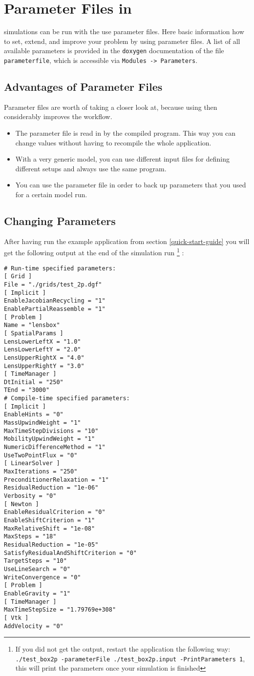 \section{Parameter Files in \Dumux}
\label{sec:inputFiles}
\Dumux simulations can be run with the use parameter files. Here basic information how to set,
extend, and improve your problem by using parameter files.
A list of all available parameters is provided in the \texttt{doxygen} documentation
of the file \texttt{parameterfile}, which is accessible via \texttt{Modules -> Parameters}.

\subsection{Advantages of Parameter Files}
Parameter files are worth of taking a closer look at, because using then considerably
improves the workflow.

\begin{itemize}
  \item The parameter file is read in by the compiled program. This way you can change
        values without having to recompile the whole application.
  \item With a very generic model, you can use different input files for defining different
        setups and always use the same program.
  \item You can use the parameter file in order to back up parameters that you used for
        a certain model run.
\end{itemize}

\subsection{Changing Parameters}
After having run the example application from section \ref{quick-start-guide} you will
get the following output at the end of the simulation run
\footnote{If you did not get the output, restart the application the following way:
\texttt{./test{\_}box2p -parameterFile ./test\_box2p.input -PrintParameters 1},
this will print the parameters once your simulation is finished}
:
\begin{lstlisting}[style=Bash]
# Run-time specified parameters:
[ Grid ]
File = "./grids/test_2p.dgf"
[ Implicit ]
EnableJacobianRecycling = "1"
EnablePartialReassemble = "1"
[ Problem ]
Name = "lensbox"
[ SpatialParams ]
LensLowerLeftX = "1.0"
LensLowerLeftY = "2.0"
LensUpperRightX = "4.0"
LensUpperRightY = "3.0"
[ TimeManager ]
DtInitial = "250"
TEnd = "3000"
# Compile-time specified parameters:
[ Implicit ]
EnableHints = "0"
MassUpwindWeight = "1"
MaxTimeStepDivisions = "10"
MobilityUpwindWeight = "1"
NumericDifferenceMethod = "1"
UseTwoPointFlux = "0"
[ LinearSolver ]
MaxIterations = "250"
PreconditionerRelaxation = "1"
ResidualReduction = "1e-06"
Verbosity = "0"
[ Newton ]
EnableResidualCriterion = "0"
EnableShiftCriterion = "1"
MaxRelativeShift = "1e-08"
MaxSteps = "18"
ResidualReduction = "1e-05"
SatisfyResidualAndShiftCriterion = "0"
TargetSteps = "10"
UseLineSearch = "0"
WriteConvergence = "0"
[ Problem ]
EnableGravity = "1"
[ TimeManager ]
MaxTimeStepSize = "1.79769e+308"
[ Vtk ]
AddVelocity = "0"
\end{lstlisting}

